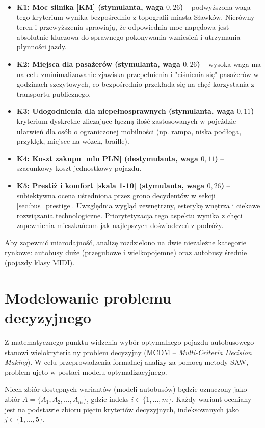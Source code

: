 \begin{itemize}
    \item \textbf{K1: Moc silnika [KM] (stymulanta, waga $0,26$)} -- podwyższona waga tego kryterium wynika bezpośrednio z topografii miasta Sławków. Nierówny teren i przewyższenia sprawiają, że odpowiednia moc napędowa jest absolutnie kluczowa do sprawnego pokonywania wzniesień i utrzymania płynności jazdy.
    \item \textbf{K2: Miejsca dla pasażerów (stymulanta, waga $0,26$)} -- wysoka waga ma na celu zminimalizowanie zjawiska przepełnienia i "ciśnienia się" pasażerów w godzinach szczytowych, co bezpośrednio przekłada się na chęć korzystania z transportu publicznego.
    \item \textbf{K3: Udogodnienia dla niepełnosprawnych (stymulanta, waga $0,11$)} -- kryterium dyskretne zliczające łączną ilość zastosowanych w pojeździe ułatwień dla osób o ograniczonej mobilności (np. rampa, niska podłoga, przyklęk, miejsce na wózek, braille).
    \item \textbf{K4: Koszt zakupu [mln PLN] (destymulanta, waga $0,11$)} -- szacunkowy koszt jednostkowy pojazdu.
    \item \textbf{K5: Prestiż i komfort [skala 1-10] (stymulanta, waga $0,26$)} -- subiektywna ocena uśredniona przez grono decydentów w sekcji \ref{sec:bus_prestige}. Uwzględnia wygląd zewnętrzny, estetykę wnętrza i ciekawe rozwiązania technologiczne. Priorytetyzacja tego aspektu wynika z chęci zapewnienia mieszkańcom jak najlepszych doświadczeń z podróży.
\end{itemize}

Aby zapewnić miarodajność, analizę rozdzielono na dwie niezależne kategorie rynkowe: autobusy duże (przegubowe i wielkopojemne) oraz autobusy średnie (pojazdy klasy MIDI).

\section{Modelowanie problemu decyzyjnego}

Z matematycznego punktu widzenia wybór optymalnego pojazdu autobusowego stanowi wielokryterialny problem decyzyjny (MCDM -- \textit{Multi-Criteria Decision Making}). W celu przeprowadzenia formalnej analizy za pomocą metody SAW, problem ujęto w postaci modelu optymalizacyjnego. 

Niech zbiór dostępnych wariantów (modeli autobusów) będzie oznaczony jako zbiór $A=\{A_1,A_2,\dots,A_m\}$, gdzie indeks $i\in\{1,\dots,m\}$. Każdy wariant oceniany jest na podstawie zbioru pięciu kryteriów decyzyjnych, indeksowanych jako $j\in\{1,\dots,5\}$. 

